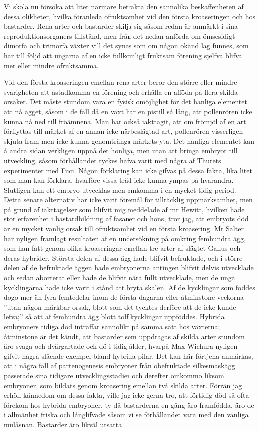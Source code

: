Vi skola nu försöka att litet närmare betrakta den sannolika beskaffenheten af dessa olikheter, hvilka föranleda ofruktsamhet vid den första kroaseringen och hos bastarder. Rena arter och bastarder skilja sig såsom redan är anmärkt i sina reproduktionsorganers tillstånd, men från det nedan anförda om ömsesidigt dimorfa och trimorfa växter vill det synas som om någon okänd lag funnes, som har till följd att ungarna af en icke fullkomligt fruktsam förening sjelfva blifva mer eller mindre ofruktsamma.

Vid den första kroaseringen emellan rena arter beror den större eller mindre svårigheten att åstadkomma en förening och erhålla en afföda på flera skilda orsaker. Det måste stundom vara en fysisk omöjlighet för det hanliga elementet att nå ägget, såsom i de fall då en växt har en pistill så lång, att pollenrören icke kunna nå ned till fröämnena. Man har också iakttagit, att om frömjöl af en art förflyttas till märket af en annan icke närbeslägtad art, pollenrören visserligen skjuta fram men icke kunna genomtränga märkets yta. Det hanliga elementet kan å andra sidan verkligen uppnå det honliga, men utan att bringa embryot till utveckling, såsom förhållandet tyckes hafva varit med några af Thurets experimenter med Fuci. Någon förklaring kan icke gifvas på dessa fakta, lika litet som man kan förklara, hvarföre vissa träd icke kunna ympas på hvarandra. Slutligen kan ett embryo utvecklas men omkomma i en mycket tidig period. Detta senare alternativ har icke varit föremål för tillräcklig uppmärksamhet, men på grund af iakttagelser som blifvit mig meddelade af mr Hewitt, hvilken hade stor erfarenhet i bastardbildning af fasaner och höns, tror jag, att embryots död är en mycket vanlig orsak till ofruktsamhet vid en första kroasering. Mr Salter har nyligen framlagt resultaten af en undersökning på omkring femhundra ägg, som han fått genom olika kroaseringar emellan tre arter af slägtet Gallus och deras hybrider. Största delen af dessa ägg hade blifvit befruktade, och i större delen af de befruktade äggen hade embryonerna antingen blifvit delvis utvecklade och sedan aborterat eller hade de blifvit nära fullt utvecklade, men de unga kycklingarna hade icke varit i stånd att bryta skalen. Af de kycklingar som föddes dogo mer än fyra femtedelar inom de första dagarna eller åtminstone veckorna ”utan någon märkbar orsak, blott som det tycktes derföre att de icke kunde lefva;” så att af femhundra ägg blott tolf kycklingar uppföddes. Hybrida embryoners tidiga död inträffar sannolikt på samma sätt hos växterna; åtminstone är det kändt, att bastarder som uppdragas af skilda arter stundom äro svaga och dvärgartade och dö i tidig ålder, hvarpå Max Wichura nyligen gifvit några slående exempel bland hybrida pilar. Det kan här förtjena anmärkas, att i några fall af partenogenesis embryoner från obefruktade silkesmaskägg passerade sina tidigare utvecklingsstadier och derefter omkommo liksom embryoner, som bildats genom kroasering emellan två skilda arter. Förrän jag erhöll kännedom om dessa fakta, ville jag icke gerna tro, att förtidig död så ofta förekom hos hybrida embryoner, ty då bastarderna en gång äro framfödda, äro de i allmänhet friska och långlifvade såsom vi se förhållandet vara med den vanliga mulåsnan. Bastarder äro likväl utsatta 